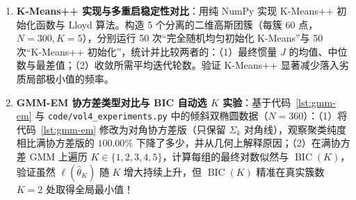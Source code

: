 \begin{enumerate}[label=\textbf{6.\arabic*}, resume]
  \item \textbf{K-Means++ 实现与多重启稳定性对比}：用纯 NumPy 实现 K-Means++ 初始化函数与 Lloyd 算法。构造 5 个分离的二维高斯团簇（每簇 60 点，$N = 300, K = 5$），分别运行 50 次“完全随机均匀初始化 K-Means”与 50 次“K-Means++ 初始化”，统计并比较两者的：（1）最终惯量 $J$ 的均值、中位数与最差值；（2）收敛所需平均迭代轮数。验证 K-Means++ 显著减少落入劣质局部极小值的频率。

  \item \textbf{GMM-EM 协方差类型对比与 BIC 自动选 $K$ 实验}：基于代码~\ref{lst:gmm-em} 与 \texttt{code/\allowbreak vol4\_experiments.py} 中的倾斜双椭圆数据（$N = 360$）：（1）将代码~\ref{lst:gmm-em} 修改为对角协方差版（只保留 $\Sigma_k$ 对角线），观察聚类纯度相比满协方差版的 $100.00\%$ 下降了多少，并从几何上解释原因；（2）在满协方差 GMM 上遍历 $K \in \{1, 2, 3, 4, 5\}$，计算每组的最终对数似然与 $\operatorname{BIC}(K)$，验证虽然 $\ell(\hat{\theta}_K)$ 随 $K$ 增大持续上升，但 $\operatorname{BIC}(K)$ 精准在真实簇数 $K = 2$ 处取得全局最小值！
\end{enumerate}
